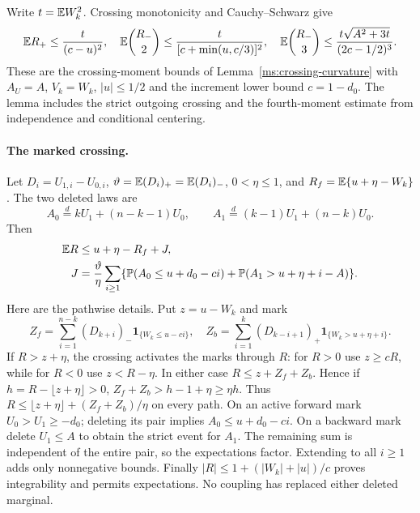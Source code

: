 Write $t=\mathbb E W_k^2$. Crossing monotonicity and Cauchy--Schwarz give
\begin{equation}\label{ms:fourier:cut49:shortloc:crossingmoments}
 \mathbb E R_+\le\frac{t}{(c-u)^2},\quad
 \mathbb E\binom{R_-}{2}\le\frac{t}{[c+\min(u,c/3)]^2},\quad
 \mathbb E\binom{R_-}{3}\le\frac{t\sqrt{A^2+3t}}{(2c-1/2)^3}.
\end{equation}
These are the crossing-moment bounds of Lemma~\ref{ms:crossing-curvature}
with $A_U=A$, $V_k=W_k$, $|u|\le1/2$ and the increment lower bound
$c=1-d_0$. The lemma includes the strict outgoing crossing and the
fourth-moment estimate from independence and conditional centering.

\paragraph{The marked crossing.}
Let $D_i=U_{1,i}-U_{0,i}$, $\vartheta=\mathbb E(D_i)_+=\mathbb E(D_i)_-$,
$0<\eta\le1$, and $R_f=\mathbb E\{u+\eta-W_k\}$. The two deleted laws are
\[
 A_0\overset{d}=kU_1+(n-k-1)U_0,\qquad
 A_1\overset{d}=(k-1)U_1+(n-k)U_0.
\]
Then
\begin{align}
 \mathbb E R&\le u+\eta-R_f+J,\label{ms:fourier:cut49:shortloc:mark}\\
 J&=\frac{\vartheta}{\eta}\sum_{i\ge1}
 \{\mathbb P(A_0\le u+d_0-ci)+\mathbb P(A_1>u+\eta+i-A)\}.\nonumber
\end{align}
Here are the pathwise details. Put $z=u-W_k$ and mark
\[
 Z_f=\sum_{i=1}^{n-k}(D_{k+i})_-\mathbf1_{\{W_k\le u-ci\}},\quad
 Z_b=\sum_{i=1}^{k}(D_{k-i+1})_+\mathbf1_{\{W_k>u+\eta+i\}}.
\]
If $R>z+\eta$, the crossing activates the marks through $R$: for $R>0$
use $z\ge cR$, while for $R<0$ use $z<R-\eta$. In either case
$R\le z+Z_f+Z_b$. Hence if $h=R-\lfloor z+\eta\rfloor>0$,
$Z_f+Z_b>h-1+\eta\ge\eta h$. Thus
$R\le\lfloor z+\eta\rfloor+(Z_f+Z_b)/\eta$ on every path.
On an active forward mark $U_0>U_1\ge-d_0$; deleting its pair implies
$A_0\le u+d_0-ci$. On a backward mark delete $U_1\le A$ to obtain the
strict event for $A_1$. The remaining sum is independent of the entire
pair, so the expectations factor. Extending to all $i\ge1$ adds only
nonnegative bounds. Finally $|R|\le1+(|W_k|+|u|)/c$ proves integrability
and permits expectations. No coupling has replaced either deleted marginal.

